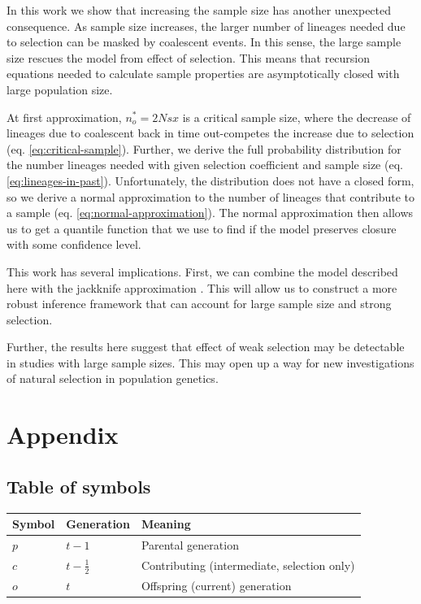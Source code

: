\documentclass[review]{elsarticle}
\begin{document}
In this work we show that increasing the sample size has another unexpected consequence. As sample
size increases, the larger number of lineages needed due to selection can be masked by coalescent
events. In this sense, the large sample size rescues the model from effect of selection. This means
that recursion equations needed to calculate sample properties are asymptotically closed with large
population size.

At first approximation, $n_o^*=2Nsx$ is a critical sample size, where the decrease of lineages due to
coalescent back in time out-competes the increase due to selection (eq. \eqref{eq:critical-sample}).
Further, we derive the full probability distribution for the number lineages needed with given
selection coefficient and sample size (eq. \eqref{eq:lineages-in-past}). Unfortunately, the
distribution does not have a closed form, so we derive a normal approximation to the number of
lineages that contribute to a sample (eq. \eqref{eq:normal-approximation}). The normal approximation
then allows us to get a quantile function that we use to find if the model preserves closure with
some confidence level.

This work has several implications. First, we can combine the model described here with the
jackknife approximation \citep{JouganousEtAl2017}. This will allow us to construct a more robust
inference framework that can account for large sample size and strong selection.

Further, the results here suggest that effect of weak selection may be detectable in studies with
large sample sizes. This may open up a way for new investigations of natural selection in population
genetics.



\section{Appendix}
\subsection{Table of symbols}

\label{ssec:tab-symbols}
\begin{center}
\begin{tabular}{lll}
Symbol & Generation & Meaning\\
\hline
$p$ & $t-1$ & Parental generation\\
$c$ & $t-\frac{1}{2}$ & Contributing (intermediate, selection only)\\
$o$ & $t$ & Offspring (current) generation\\
\end{tabular}
\end{center}
\end{document}
